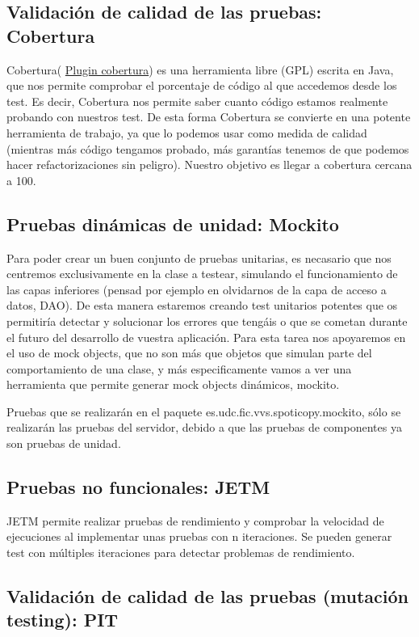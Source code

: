 \documentclass[12pt, a4paper, titlepage]{article}
\begin{document}
	\subsection{Validación de calidad de las pruebas: Cobertura}
	Cobertura( \href{http://cobertura.sourceforge.net/}{Plugin cobertura}) es una herramienta libre (GPL) escrita en Java, que nos permite comprobar el porcentaje de código al que accedemos desde los test. Es decir, Cobertura nos permite saber cuanto código estamos realmente probando con nuestros test.
	De esta forma Cobertura se convierte en una potente herramienta de trabajo, ya que lo podemos usar como medida de calidad (mientras más código tengamos probado, más garantías tenemos de que podemos hacer refactorizaciones sin peligro).
	Nuestro objetivo es llegar a cobertura cercana a 100.
	
	\subsection{Pruebas dinámicas de unidad: Mockito}
	Para poder crear un buen conjunto de pruebas unitarias, es necasario que nos centremos exclusivamente en la clase a testear, simulando el funcionamiento de las capas inferiores (pensad por ejemplo en olvidarnos de la capa de acceso a datos, DAO). De esta manera estaremos creando test unitarios potentes que os permitiría detectar y solucionar los errores que tengáis o que se cometan durante el futuro del desarrollo de vuestra aplicación.
	Para esta tarea nos apoyaremos en el uso de mock objects, que no son más que objetos que simulan parte del comportamiento de una clase, y más especificamente vamos a ver una herramienta que permite generar mock objects dinámicos, mockito.
	
	Pruebas que se realizarán en el paquete es.udc.fic.vvs.spoticopy.mockito, sólo se realizarán las pruebas del servidor, debido a que las pruebas de componentes ya son pruebas de unidad.
	\subsection{Pruebas no funcionales: JETM}
	JETM permite realizar pruebas de rendimiento y comprobar la velocidad de ejecuciones al implementar unas pruebas con n iteraciones. Se pueden generar test con múltiples iteraciones para detectar problemas de rendimiento.
	\subsection{Validación de calidad de las pruebas (mutación testing): PIT}
	
\end{document}
